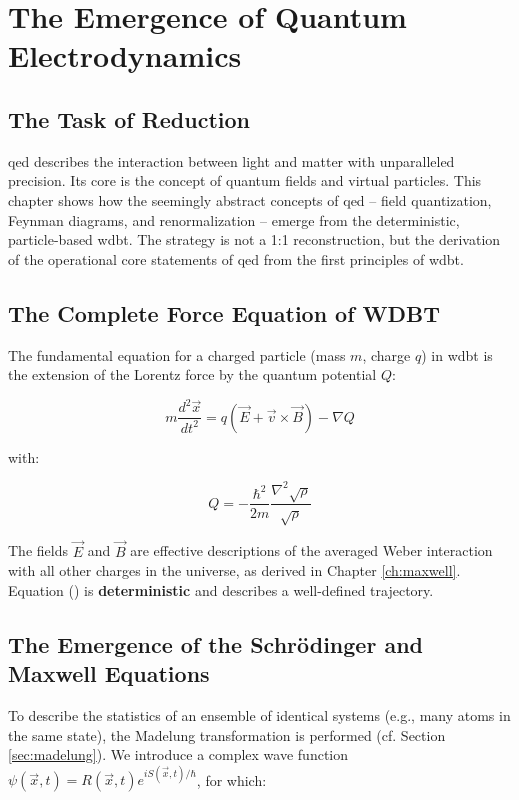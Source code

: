\chapter{The Emergence of Quantum Electrodynamics}
\section{The Task of Reduction}
\gls{qed} describes the interaction between light and matter with unparalleled precision. Its core is the concept of quantum fields and virtual particles. This chapter shows how the seemingly abstract concepts of \gls{qed} – field quantization, Feynman diagrams, and renormalization – emerge from the deterministic, particle-based \gls{wdbt}. The strategy is not a 1:1 reconstruction, but the derivation of the operational core statements of \gls{qed} from the first principles of \gls{wdbt}.

\section{The Complete Force Equation of WDBT}
The fundamental equation for a charged particle (mass $m$, charge $q$) in \gls{wdbt} is the extension of the Lorentz force by the quantum potential $Q$:

\begin{equation}
    \label{eq:kraft_wdbt_em}
    m \frac{d^2\vec{x}}{dt^2} = q(\vec{E} + \vec{v} \times \vec{B}) - \nabla Q
\end{equation}

with:

\begin{equation}
    \label{eq:quantenpotential_wdbt_em}
    Q = -\frac{\hbar^2}{2m} \frac{\nabla^2 \sqrt{\rho}}{\sqrt{\rho}}
\end{equation}

The fields $\vec{E}$ and $\vec{B}$ are effective descriptions of the averaged Weber interaction with all other charges in the universe, as derived in Chapter \ref{ch:maxwell}. Equation () is \textbf{deterministic} and describes a well-defined trajectory.

\newpage
\section{The Emergence of the Schrödinger and Maxwell Equations}
To describe the statistics of an ensemble of identical systems (e.g., many atoms in the same state), the Madelung transformation is performed (cf. Section \ref{sec:madelung}). We introduce a complex wave function $\psi(\vec{x},t)=R(\vec{x},t)e^{iS(\vec{x},t)/\hbar}$, for which:

